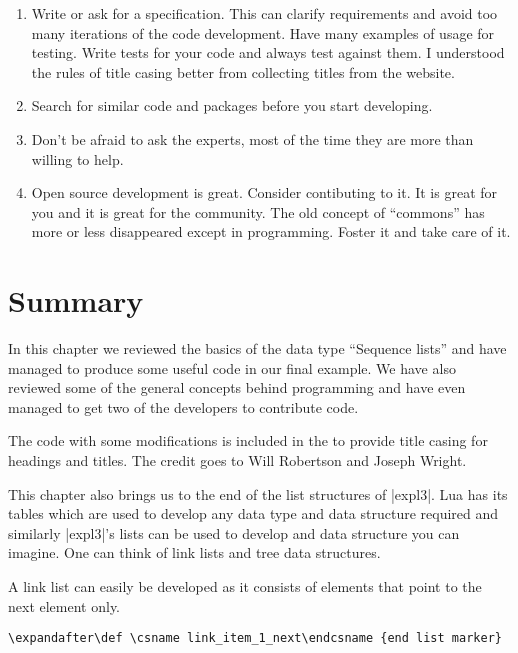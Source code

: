 \begin{enumerate}
\item Write or ask for a specification. This can clarify requirements and avoid too many iterations of the code development. Have many examples of usage for testing.  Write tests for your code and always test against them. I understood the rules of title casing better from collecting titles from the \arxiv website.

\item Search for similar code and packages before you start developing.

\item Don't be afraid to ask the experts, most of the time they are more than willing to help.

\item Open source development is great. Consider contibuting to it. It is great for you and it is great for the community. The old concept of ``commons'' has more or less disappeared except in programming. Foster it and take care of it.
\end{enumerate}


\section{Summary}

In this chapter we reviewed the basics of the data type \enquote{Sequence lists} and have managed to produce some useful code in our final example. We have also reviewed some of the general concepts behind programming and have even managed to get two of the  developers to contribute code.

The code with some modifications is included in the  to provide title casing for headings and titles. The credit goes to Will Robertson and Joseph Wright. 

This chapter also brings us to the end of the list structures of |expl3|. Lua has its tables which are used to develop any data type and data structure required and similarly |expl3|'s lists can be used to develop and data structure you can imagine. One can think of link lists and tree data structures.

A link list can easily be developed as it consists of elements that point to the next element only.  

\begin{verbatim}
\expandafter\def \csname link_item_1_next\endcsname {end list marker}
\end{verbatim}

